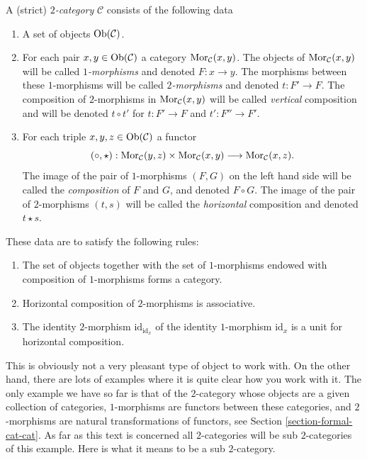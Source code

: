 \begin{definition}
\label{definition-2-category}
A (strict) {\it $2$-category} $\mathcal{C}$ consists of the following data
\begin{enumerate}
\item A set of objects $\mathop{\mathrm{Ob}}\nolimits(\mathcal{C})$.
\item For each pair $x, y \in \mathop{\mathrm{Ob}}\nolimits(\mathcal{C})$
a category $\mathop{\mathrm{Mor}}\nolimits_\mathcal{C}(x, y)$. The objects of
$\mathop{\mathrm{Mor}}\nolimits_\mathcal{C}(x, y)$ will be called {\it $1$-morphisms}
and denoted $F : x \to y$. The morphisms between these $1$-morphisms
will be called {\it $2$-morphisms} and denoted $t : F' \to F$.
The composition of $2$-morphisms in $\mathop{\mathrm{Mor}}\nolimits_\mathcal{C}(x, y)$
will be called {\it vertical} composition and will be
denoted $t \circ t'$ for $t : F' \to F$ and $t' : F'' \to F'$.
\item For each triple $x, y, z\in \mathop{\mathrm{Ob}}\nolimits(\mathcal{C})$ a
functor
$$
(\circ, \star) :
\mathop{\mathrm{Mor}}\nolimits_\mathcal{C}(y, z) \times \mathop{\mathrm{Mor}}\nolimits_\mathcal{C}(x, y)
\longrightarrow
\mathop{\mathrm{Mor}}\nolimits_\mathcal{C}(x, z).
$$
The image of the pair of $1$-morphisms $(F, G)$ on the left hand side
will be called the {\it composition} of $F$ and $G$, and denoted
$F\circ G$. The image of the pair of $2$-morphisms $(t, s)$ will
be called the {\it horizontal} composition and denoted $t \star s$.
\end{enumerate}
These data are to satisfy the following rules:
\begin{enumerate}
\item The set of objects together with the set of $1$-morphisms endowed
with composition of $1$-morphisms forms a category.
\item Horizontal composition of $2$-morphisms is associative.
\item The identity $2$-morphism $\text{id}_{\text{id}_x}$
of the identity $1$-morphism $\text{id}_x$ is a unit for
horizontal composition.
\end{enumerate}
\end{definition}

\noindent
This is obviously not a very pleasant type of object to work with.
On the other hand, there are lots of examples where it is quite clear
how you work with it. The only example we have so far is that of
the $2$-category whose objects are a given collection of categories,
$1$-morphisms are functors between these categories,
and $2$-morphisms are natural transformations of functors, see
Section \ref{section-formal-cat-cat}.
As far as this text is concerned all $2$-categories will be
sub $2$-categories of this example. Here is what it means to be
a sub $2$-category.

